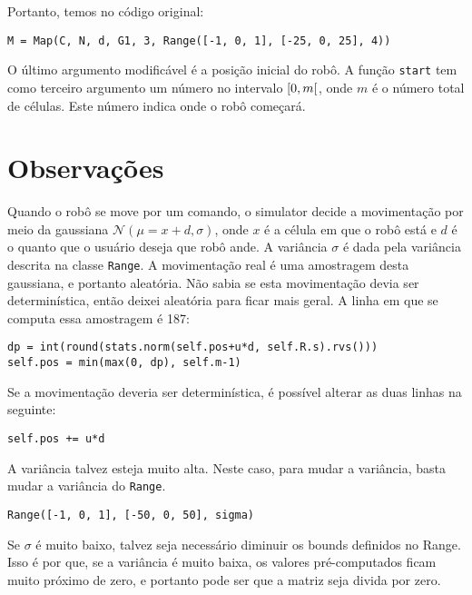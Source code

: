\documentclass[12pt]{article}
\theoremstyle{plain}
\numberwithin{equation}{section}
\newcommand{\code}[1]{\lstinline[mathescape=true]{#1}}
\begin{document}
Portanto, temos no código original:\\

\begin{lstlisting}
M = Map(C, N, d, G1, 3, Range([-1, 0, 1], [-25, 0, 25], 4))
\end{lstlisting}

O último argumento modificável é a posição inicial do robô. A função \code{start} tem como terceiro
argumento um número no intervalo $\interval[open right]{0}{m}$, onde $m$ é o número total de
células. Este número indica onde o robô começará.

\section{Observações}

Quando o robô se move por um comando, o simulator decide a movimentação por meio da gaussiana
$\mathcal{N}(\mu=x+d,\sigma)$, onde $x$ é a célula em que o robô está e $d$ é o quanto que o
usuário deseja que robô ande. A variância $\sigma$ é dada pela variância descrita na classe
\code{Range}. A movimentação real é uma amostragem desta gaussiana, e portanto aleatória. Não sabia
se esta movimentação devia ser determinística, então deixei aleatória para ficar mais geral. A
linha em que se computa essa amostragem é 187:\\

\begin{lstlisting}
dp = int(round(stats.norm(self.pos+u*d, self.R.s).rvs()))
self.pos = min(max(0, dp), self.m-1)
\end{lstlisting}

Se a movimentação deveria ser determinística, é possível alterar as duas linhas na seguinte:\\

\begin{lstlisting}
self.pos += u*d
\end{lstlisting}

A variância talvez esteja muito alta. Neste caso, para mudar a variância, basta mudar a variância
do \code{Range}.\\

\begin{lstlisting}
Range([-1, 0, 1], [-50, 0, 50], sigma)
\end{lstlisting}

Se $\sigma$ é muito baixo, talvez seja necessário diminuir os bounds definidos no Range. Isso é por
que, se a variância é muito baixa, os valores pré-computados ficam muito próximo de zero, e
portanto pode ser que a matriz seja divida por zero.
\end{document}
